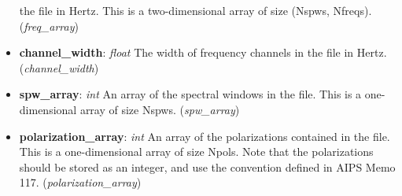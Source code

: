 \documentclass[11pt, oneside]{article}
\begin{document}
\begin{itemize}
  the file in Hertz. This is a two-dimensional array of size (Nspws,
  Nfreqs). (\textit{freq\_array})
\item \textbf{channel\_width}: \textit{float} The width of frequency channels in
  the file in Hertz. (\textit{channel\_width})
\item \textbf{spw\_array}: \textit{int} An array of the spectral windows in the
  file. This is a one-dimensional array of size Nspws. (\textit{spw\_array})
\item \textbf{polarization\_array}: \textit{int} An array of the polarizations
  contained in the file. This is a one-dimensional array of size Npols. Note
  that the polarizations should be stored as an integer, and use the convention
  defined in AIPS Memo 117. (\textit{polarization\_array})
\end{itemize}
\end{document}
